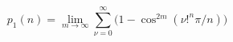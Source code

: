 $$
p_1(n) =
\lim_{m\to \infty} \sum_{\nu = 0}^{\infty} \bigl(1-\cos^{2m}(\nu !^n \pi/n) \bigr)
$$


\bye


